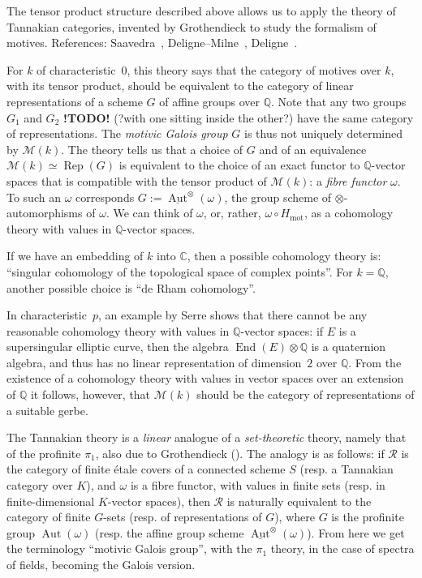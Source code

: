 \documentclass{article}
\theoremstyle{definition}
\newcommand{\sh}{\mathscr}
\newcommand{\QQ}{\mathbb{Q}}
\newcommand{\CC}{\mathbb{C}}
\newcommand{\mot}{\mathrm{mot}}
\DeclareMathOperator{\End}{End}
\DeclareMathOperator{\Aut}{Aut}
\DeclareMathOperator{\Rep}{Rep}
\newcommand{\todo}{\textbf{ !TODO! }}
\newcommand{\oldpage}[1]{\marginpar{\footnotesize$\Big\vert$ \textit{p.~#1}}}
\begin{document}
The tensor product structure described above allows us to apply the theory of Tannakian categories, invented by Grothendieck to study the formalism of motives.
References: Saavedra~\cite{28}, Deligne--Milne~\cite{12}, Deligne~\cite{15}.

For $k$ of characteristic~$0$, this theory says that the category of motives over $k$, with its tensor product, should be equivalent to the category of linear representations of a scheme $G$ of affine groups over $\QQ$.
Note that any two groups $G_1$ and $G_2$ \todo(?with one sitting inside the other?) have the same category of representations.
The \emph{motivic Galois group} $G$ is thus not uniquely determined by $\sh{M}(k)$.
The theory tells us that a choice of $G$ and of an equivalence $\sh{M}(k)\simeq\Rep(G)$ is equivalent to the choice of an exact functor to $\QQ$-vector spaces that is compatible with the tensor product of $\sh{M}(k)$: a \emph{fibre functor} $\omega$.
To such an $\omega$ corresponds $G:=\underline{\Aut}^\otimes(\omega)$, the group scheme of $\otimes$-automorphisms of $\omega$.
We can think of $\omega$, or, rather, $\omega\circ H_\mot$, as a cohomology theory with values in $\QQ$-vector spaces.

\oldpage{146}
If we have an embedding of $k$ into $\CC$, then a possible cohomology theory is: ``singular cohomology of the topological space of complex points''.
For $k=\QQ$, another possible choice is ``de Rham cohomology''.

In characteristic~$p$, an example by Serre shows that there cannot be any reasonable cohomology theory with values in $\QQ$-vector spaces: if $E$ is a supersingular elliptic curve, then the algebra $\End(E)\otimes\QQ$ is a quaternion algebra, and thus has no linear representation of dimension~$2$ over $\QQ$.
From the existence of a cohomology theory with values in vector spaces over an extension of $\QQ$ it follows, however, that $\sh{M}(k)$ should be the category of representations of a suitable gerbe.

The Tannakian theory is a \emph{linear} analogue of a \emph{set-theoretic} theory, namely that of the profinite $\pi_1$, also due to Grothendieck (\cite{SGA1}).
The analogy is as follows: if $\sh{R}$ is the category of finite \'{e}tale covers of a connected scheme $S$ (resp. a Tannakian category over $K$), and $\omega$ is a fibre functor, with values in finite sets (resp. in finite-dimensional $K$-vector spaces), then $\sh{R}$ is naturally equivalent to the category of finite $G$-sets (resp. of representations of $G$), where $G$ is the profinite group $\Aut(\omega)$ (resp. the affine group scheme $\underline{\Aut}^\otimes(\omega)$).
From here we get the terminology ``motivic Galois group'', with the $\pi_1$ theory, in the case of spectra of fields, becoming the Galois version.
\end{document}
